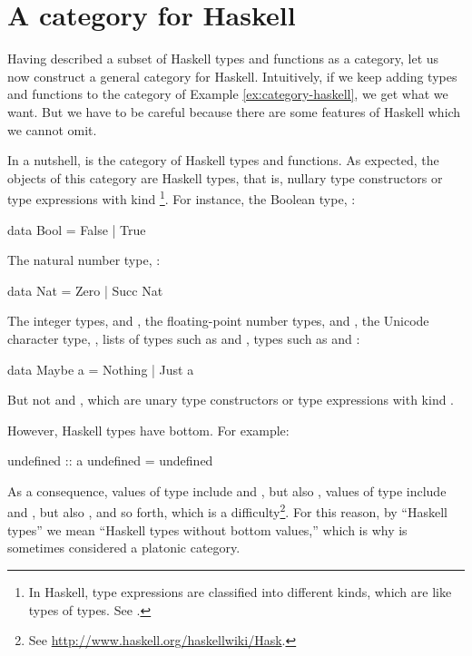 \section{A category for Haskell}
\label{sec:category-haskell}

Having described a subset of Haskell types and functions as a
category, let us now construct a general category for Haskell.
Intuitively, if we keep adding types and functions to the category of
Example \ref{ex:category-haskell}, we get what we want. But we have to
be careful because there are some features of Haskell which we cannot
omit.

In a nutshell, \hask is the category of Haskell types and functions.
As expected, the objects of this category are Haskell types, that is,
nullary type constructors or type expressions with kind
\texthaskell{*}\footnote{In Haskell, type expressions are classified
  into different kinds, which are like types of types. See
  \parencite[§ 4.1.1]{peytonjones-2003}.}. For instance, the Boolean
type, :
\begin{codehaskell}
data Bool = False | True
\end{codehaskell}
The natural number type, :
\begin{codehaskell}
data Nat = Zero | Succ Nat
\end{codehaskell}
The integer types,  and , the
floating-point number types,  and
, the Unicode character type, ,
lists of types such as \texthaskell{[Bool]} and \texthaskell{[Nat]},
 types such as  and
:
\begin{codehaskell}
data Maybe a = Nothing | Just a
\end{codehaskell}
But not \texthaskell{[]} and , which are unary type
constructors or type expressions with kind \texthaskell{* -> *}.

However, Haskell types have bottom. For example:
\begin{codehaskell}
undefined :: a
undefined = undefined
\end{codehaskell}
As a consequence, values of type  include
 and , but also
, values of type  include
 and , but also
, and so forth, which is a
difficulty\footnote{See
  \url{http://www.haskell.org/haskellwiki/Hask}.}. For this reason, by
``Haskell types'' we mean ``Haskell types without bottom values,''
which is why \hask is sometimes considered a platonic category.

